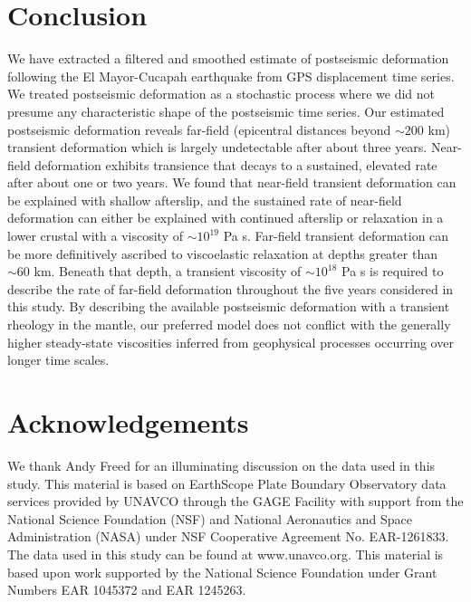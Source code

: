 \documentclass[draft,linenumbers]{AGUJournal}
\begin{document}
\section{Conclusion}

We have extracted a filtered and smoothed estimate of postseismic deformation following the El Mayor-Cucapah earthquake from GPS displacement time series.  We treated postseismic deformation as a stochastic process where we did not presume any characteristic shape of the postseismic time series.  Our estimated postseismic deformation reveals far-field (epicentral distances beyond ${\sim}200$ km) transient deformation which is largely undetectable after about three years. Near-field deformation exhibits transience that decays to a sustained, elevated rate after about one or two years.  We found that near-field transient deformation can be explained with shallow afterslip, and the sustained rate of near-field deformation can either be explained with continued afterslip or relaxation in a lower crustal with a viscosity of ${\sim}10^{19}$ Pa s.  Far-field transient deformation can be more definitively ascribed to viscoelastic relaxation at depths greater than ${\sim}60$ km. Beneath that depth, a transient viscosity of ${\sim}10^{18}$ Pa s is required to describe the rate of far-field deformation throughout the five years considered in this study.  By describing the available postseismic deformation with a transient rheology in the mantle, our preferred model does not conflict with the generally higher steady-state viscosities inferred from geophysical processes occurring over longer time scales.

\section*{Acknowledgements}
We thank Andy Freed for an illuminating discussion on the data used in this study.  This material is based on EarthScope Plate Boundary Observatory data services provided by UNAVCO through the GAGE Facility with support from the National Science Foundation (NSF) and National Aeronautics and Space Administration (NASA) under NSF Cooperative Agreement No. EAR-1261833.  The data used in this study can be found at www.unavco.org. This material is based upon work supported by the National Science Foundation under Grant Numbers EAR 1045372 and EAR 1245263.


%
%
%
%
%
%
\end{document}
